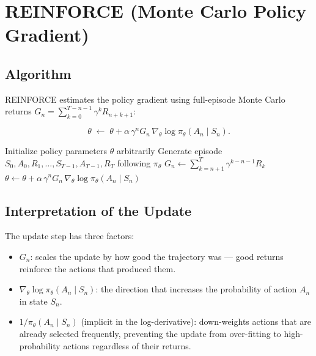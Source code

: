 \documentclass[11pt,a4paper]{article}
\theoremstyle{definition}
\theoremstyle{plain}
\theoremstyle{remark}
\begin{document}
\section{REINFORCE (Monte Carlo Policy Gradient)}

\subsection{Algorithm}

REINFORCE estimates the policy gradient using full-episode Monte Carlo returns $G_n = \sum_{k=0}^{T-n-1} \gamma^k R_{n+k+1}$:

\begin{tcolorbox}[colback=blue!5!white,colframe=blue!75!black,title=\textbf{REINFORCE Update}]
\[
    \theta \;\leftarrow\; \theta + \alpha\, \gamma^n G_n\, \nabla_\theta \log \pi_\theta(A_n \mid S_n).
\]
\end{tcolorbox}

\begin{algorithm}
\caption{REINFORCE (Monte Carlo Policy Gradient)}
\begin{algorithmic}
\STATE Initialize policy parameters $\theta$ arbitrarily
    \STATE Generate episode $S_0, A_0, R_1, \ldots, S_{T-1}, A_{T-1}, R_T$ following $\pi_\theta$
        \STATE $G_n \leftarrow \sum_{k=n+1}^{T} \gamma^{k-n-1} R_k$
        \STATE $\theta \leftarrow \theta + \alpha\, \gamma^n G_n\, \nabla_\theta \log \pi_\theta(A_n \mid S_n)$
    \ENDFOR
\ENDWHILE
\end{algorithmic}
\end{algorithm}

\subsection{Interpretation of the Update}

The update step has three factors:
\begin{itemize}
    \item $G_n$: scales the update by how good the trajectory was — good returns reinforce the actions that produced them.
    \item $\nabla_\theta \log \pi_\theta(A_n \mid S_n)$: the direction that increases the probability of action $A_n$ in state $S_n$.
    \item $1/\pi_\theta(A_n \mid S_n)$ (implicit in the log-derivative): down-weights actions that are already selected frequently, preventing the update from over-fitting to high-probability actions regardless of their returns.
\end{itemize}
\end{document}
